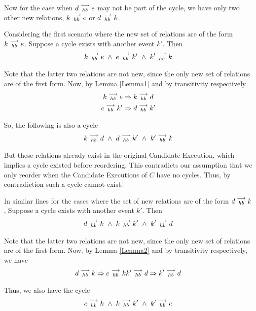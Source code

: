 
    Now for the case when $d\stackrel{\longrightarrow}{_{hb}}e$ may not be part of the cycle, we have only two other new relations, $k\stackrel{\longrightarrow}{_{hb}}e$ or $d\stackrel{\longrightarrow}{_{hb}}k$.

    Considering the first scenario where the new set of relations are of the form $k\stackrel{\longrightarrow}{_{hb}}e$. Suppose a cycle exists with another event $k'$. Then 
    \[
        k\stackrel{\longrightarrow}{_{hb}}e \ \wedge \
        e\stackrel{\longrightarrow}{_{hb}}k' \ \wedge \
        k'\stackrel{\longrightarrow}{_{hb}}k
    \]

    Note that the latter two relations are not new, since the only new set of relations are of the first form. Now, by Lemma \ref{Lemma1} and by transitivity respectively
    \begin{gather*}
        k\stackrel{\longrightarrow}{_{hb}}e \Rightarrow k\stackrel{\longrightarrow}{_{hb}}d \\
        e\stackrel{\longrightarrow}{_{hb}}k' \Rightarrow d\stackrel{\longrightarrow}{_{hb}}k'    
    \end{gather*}

    So, the following is also a cycle
    \[
        k\stackrel{\longrightarrow}{_{hb}}d \ \wedge \
        d\stackrel{\longrightarrow}{_{hb}}k' \ \wedge \
        k'\stackrel{\longrightarrow}{_{hb}}k
    \]

    But these relations already exist in the original Candidate Execution, which implies a cycle existed before reordering. This contradicts our assumption that we only reorder when the Candidate Executions of $C$ have no cycles. Thus, by contradiction such a cycle cannot exist.

    In similar lines for the cases where the set of new relations are of the form $d\stackrel{\longrightarrow}{_{hb}}k$,  Suppose a cycle exists with another event $k'$. Then 
    \begin{align*}
        \reln{d}{hb}{k} \ \wedge \
        \reln{k}{hb}{k'} \ \wedge \ 
        \reln{k'}{hb}{d} 
    \end{align*}

    Note that the latter two relations are not new, since the only new set of relations are of the first form. Now, by Lemma \ref{Lemma2} and by transitivity respectively, we have 
    \begin{align*}
        d\stackrel{\longrightarrow}{_{hb}}k \Rightarrow e\stackrel{\longrightarrow}{_{hb}}k
        k'\stackrel{\longrightarrow}{_{hb}}d \Rightarrow k'\stackrel{\longrightarrow}{_{hb}}d
    \end{align*}

    Thus, we also have the cycle 
    \begin{align*}
        \reln{e}{hb}{k} \ \wedge \
        \reln{k}{hb}{k'} \ \wedge \ 
        \reln{k'}{hb}{e} 
    \end{align*}

